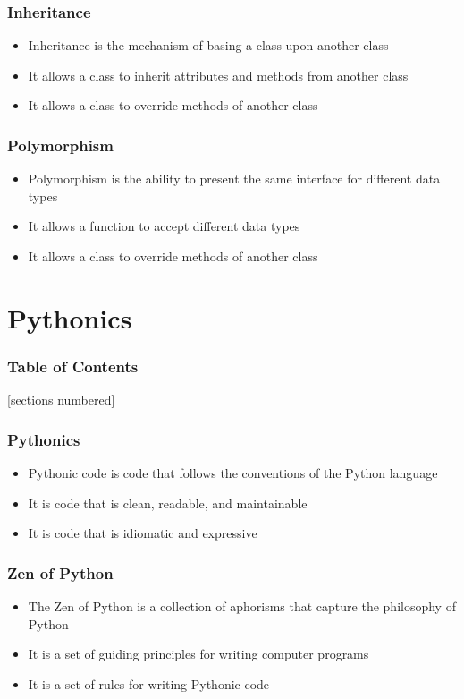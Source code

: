 \documentclass[serif, 9pt, aspectratio=32]{beamer}
\begin{document}
\begin{frame}
    \centering
    \frametitle{Inheritance}
    \begin{itemize}
        \setlength{\itemsep}{2em}
        \item Inheritance is the mechanism of basing a class upon another class
        \item It allows a class to inherit attributes and methods from another class
        \item It allows a class to override methods of another class
    \end{itemize}
\end{frame}

\begin{frame}
    \centering
    \frametitle{Polymorphism}
    \begin{itemize}
        \setlength{\itemsep}{2em}
        \item Polymorphism is the ability to present the same interface for different data types
        \item It allows a function to accept different data types
        \item It allows a class to override methods of another class
    \end{itemize}
\end{frame}

\section{Pythonics}

\begin{frame}
    \frametitle{Table of Contents}
    [sections numbered]
    \tableofcontents[currentsection]
\end{frame}

\begin{frame}
    \centering
    \frametitle{Pythonics}
    \begin{itemize}
        \setlength{\itemsep}{2em}
        \item Pythonic code is code that follows the conventions of the Python language
        \item It is code that is clean, readable, and maintainable
        \item It is code that is idiomatic and expressive
    \end{itemize}
\end{frame}

\begin{frame}
    \centering
    \frametitle{Zen of Python}
    \begin{itemize}
        \setlength{\itemsep}{2em}
        \item The Zen of Python is a collection of aphorisms that capture the philosophy of Python
        \item It is a set of guiding principles for writing computer programs
        \item It is a set of rules for writing Pythonic code
    \end{itemize}
\end{frame}
\end{document}
